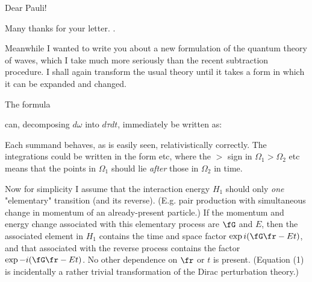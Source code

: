 \date{February 2, 1937}


Dear Pauli!

Many thanks for your letter. .

Meanwhile I wanted to write you about a new formulation of the quantum theory of waves, which I take much more seriously than the recent subtraction procedure. I shall again transform the usual theory until it takes a form in which it can be expanded and changed.

The formula


can, decomposing ${d\omega}$ into ${d\tau}{dt}$, immediately be written as:

Each summand behaves, as is easily seen, relativistically correctly. The integrations could be written in the form
etc, where the $>$ sign in $\Omega_1>\Omega_2$ etc means that the points in $\Omega_1$ should lie \textit{after} those in $\Omega_2$ in time.

Now for simplicity I assume that the interaction energy $H_1$ should  only \textit{one} "elementary" transition (and its reverse). (E.g. pair production with simultaneous change in momentum of an already-present particle.) If the momentum and energy change associated with this elementary process are $\fG$ and $E$, then the associated element in $H_1$ contains the time and space factor $\exp{i(\fG\fr - Et)}$, and that associated with the reverse process contains the factor $\exp{-i(\fG\fr - Et)}$. No other dependence on $\fr$ or $t$ is present. (Equation (1) is incidentally a rather trivial transformation of the Dirac perturbation theory.)

